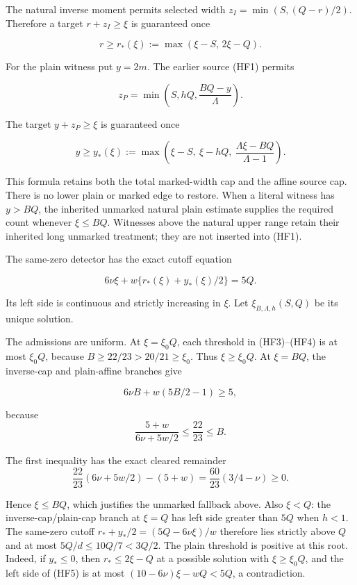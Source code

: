 The natural inverse moment permits selected width \(z_I=\min(S,(Q-r)/2)\). Therefore a target \(r+z_I\ge\xi\) is guaranteed once

\[
 r\ge r_*(\xi):=\max(\xi-S,\,2\xi-Q).
\tag{HF3}
\]

For the plain witness put \(y=2m\). The earlier source (HF1) permits

\[
 z_P=\min\!\left(S,hQ,\frac{BQ-y}{\Lambda}\right).
\]

The target \(y+z_P\ge\xi\) is guaranteed once

\[
 y\ge y_*(\xi):=
 \max\!\left(\xi-S,\ \xi-hQ,\
                  \frac{\Lambda\xi-BQ}{\Lambda-1}\right).
\tag{HF4}
\]

This formula retains both the total marked-width cap and the affine source cap. There is no lower plain or marked edge to restore. When a literal witness has \(y>BQ\), the inherited unmarked natural plain estimate supplies the required count whenever \(\xi\le BQ\). Witnesses above the natural upper range retain their inherited long unmarked treatment; they are not inserted into (HF1).

The same-zero detector has the exact cutoff equation

\[
 6\nu\xi+w\{r_*(\xi)+y_*(\xi)/2\}=5Q.
\tag{HF5}
\]

Its left side is continuous and strictly increasing in \(\xi\). Let \(\xi_{B,\Lambda,h}(S,Q)\) be its unique solution.

The admissions are uniform. At \(\xi=\xi_0Q\), each threshold in (HF3)--(HF4) is at most \(\xi_0Q\), because \(B\ge22/23>20/21\ge\xi_0\). Thus \(\xi\ge\xi_0Q\). At \(\xi=BQ\), the inverse-cap and plain-affine branches give

\[
6\nu B+w(5B/2-1)\ge5,
\]

because \[
\frac{5+w}{6\nu+5w/2}\le\frac{22}{23}\le B.
\]

The first inequality has the exact cleared remainder \[
 \frac{22}{23}(6\nu+5w/2)-(5+w)
 =\frac{60}{23}(3/4-\nu)\ge0.
\]

Hence \(\xi\le BQ\), which justifies the unmarked fallback above. Also \(\xi<Q\): the inverse-cap/plain-cap branch at \(\xi=Q\) has left side greater than \(5Q\) when \(h<1\). The same-zero cutoff \(r_*+y_*/2=(5Q-6\nu\xi)/w\) therefore lies strictly above \(Q\) and at most \(5Q/d\le10Q/7<3Q/2\). The plain threshold is positive at this root. Indeed, if \(y_*\le0\), then \(r_*\le2\xi-Q\) at a possible solution with \(\xi\ge\xi_0Q\), and the left side of (HF5) is at most \((10-6\nu)\xi-wQ<5Q\), a contradiction.


